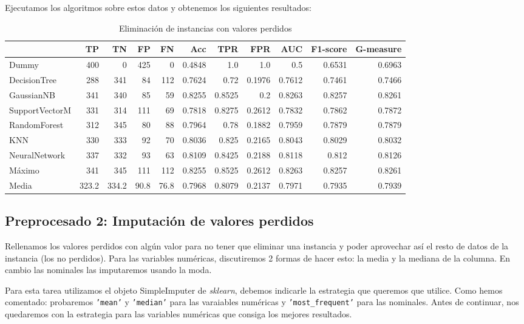 \documentclass{article}
\begin{document}
Ejecutamos los algoritmos sobre estos datos y obtenemos los siguientes
resultados:

\begin{table}[H]
\centering
\caption{Eliminación de instancias con valores perdidos}
\label{tab:dropna}
\begin{tabular}{|lrrrrrrrrrr|}
\hline
 & TP & TN & FP & FN & Acc & TPR & FPR & AUC & F1-score & G-measure\\ \hline
Dummy & 400 & 0 & 425 & 0 & 0.4848 & 1.0 & 1.0 & 0.5 & 0.6531 & 0.6963\\
DecisionTree & 288 & 341 & 84 & 112 & 0.7624 & 0.72 & 0.1976 & 0.7612 & 0.7461 & 0.7466\\
GaussianNB & 341 & 340 & 85 & 59 & 0.8255 & 0.8525 & 0.2 & 0.8263 & 0.8257 & 0.8261\\
SupportVectorM & 331 & 314 & 111 & 69 & 0.7818 & 0.8275 & 0.2612 & 0.7832 & 0.7862 & 0.7872\\
RandomForest & 312 & 345 & 80 & 88 & 0.7964 & 0.78 & 0.1882 & 0.7959 & 0.7879 & 0.7879\\
KNN & 330 & 333 & 92 & 70 & 0.8036 & 0.825 & 0.2165 & 0.8043 & 0.8029 & 0.8032\\
NeuralNetwork & 337 & 332 & 93 & 63 & 0.8109 & 0.8425 & 0.2188 & 0.8118 & 0.812 & 0.8126\\ \hline
Máximo & 341 & 345 & 111 & 112 & 0.8255 & 0.8525 & 0.2612 & 0.8263 & 0.8257 & 0.8261\\
Media & 323.2 & 334.2 & 90.8 & 76.8 & 0.7968 & 0.8079 & 0.2137 & 0.7971 & 0.7935 & 0.7939\\
\hline
\end{tabular}
\end{table}

\subsection{Preprocesado 2: Imputación de valores perdidos}

Rellenamos los valores perdidos con algún valor para no tener que
eliminar una instancia y poder aprovechar así el resto de datos de la
instancia (los no perdidos). Para las variables numéricas,
discutiremos 2 formas de hacer esto: la media y la mediana de la
columna. En cambio las nominales las imputaremos usando la moda.

Para esta tarea utilizamos el objeto SimpleImputer de
\textit{sklearn}, debemos indicarle la estrategia que queremos que
utilice. Como hemos comentado: probaremos \texttt{'mean'} y
\texttt{'median'} para las varaiables numéricas y
\texttt{'most\_frequent'} para las nominales. Antes de continuar, nos
quedaremos con la estrategia para las variables numéricas que consiga
los mejores resultados.
\end{document}
